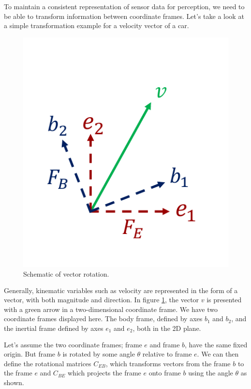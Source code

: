 To maintain a consistent representation of sensor data for perception, we need to be able to transform information between coordinate frames. 
Let's take a look at a simple transformation example for a velocity vector of a car.

\begin{figure}[!htb]
\begin{center}
\includegraphics[scale=0.290]{img/coordinate_transforms/vector_rotation.jpeg}
\end{center}
\caption{Schematic of vector rotation.}
\label{vector_rotation}
\end{figure}


Generally, kinematic variables such as velocity are represented in the form of a vector, with both magnitude and direction. In figure \ref{vector_rotation}, the vector $v$ is presented with a green arrow in a two-dimensional coordinate frame. We have two coordinate frames displayed here. The body frame, defined by axes $b_1$ and $b_2$, and the inertial frame defined by axes $e_1$ and $e_2$, both in the 2D plane. 

Let's assume the two coordinate frames; frame $e$ and frame $b$, have the same fixed origin. But frame $b$ is rotated by some angle $\theta$ relative to frame $e$. We can then define the rotational matrices $C_{EB}$, which transforms vectors from the frame $b$ to the frame $e$ and $C_{BE}$ which projects the frame $e$ onto frame $b$ using the angle $\theta$ as shown.

